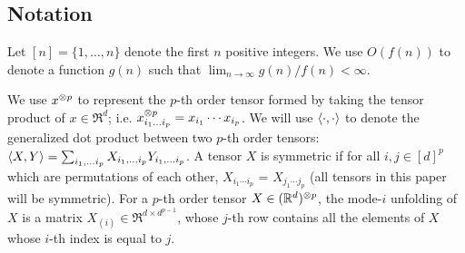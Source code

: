 




\subsection{Notation}


Let $[n] = \{ 1, \dots, n \}$ denote the first $n$ positive integers.
We use $O(f(n))$ to denote a function $g(n)$ such that $\lim_{n \to\infty} g(n)/f(n) < \infty$.

We use $x^{\otimes p}$ to represent the $p$-th order tensor formed by taking
the tensor product of $x \in \Re^d$; i.e. $x^{\otimes p}_{i_1 \ldots i_p}
= x_{i_1} \cdots x_{i_p}$. We will use $\langle \cdot, \cdot \rangle$ to denote
the generalized dot product between two $p$-th order tensors:
$\langle X, Y \rangle = \sum_{i_1, \ldots i_p} X_{i_1, \ldots i_p} Y_{i_1,
\ldots i_p}$.  A tensor $X$ is symmetric if for all $i,j \in [d]^p$
which are permutations of each other, $X_{i_1 \cdots i_p}$ = $X_{j_1
\cdots j_p}$ (all tensors in this paper will be symmetric).  For
a $p$-th order tensor $X \in (\mathbb{R}^d)^{\otimes p}$, the mode-$i$ unfolding of
$X$ is a matrix $X_{(i)} \in \Re^{d \times d^{p-1}}$, whose $j$-th row contains all the elements of $X$ whose
$i$-th index is equal to $j$. 

